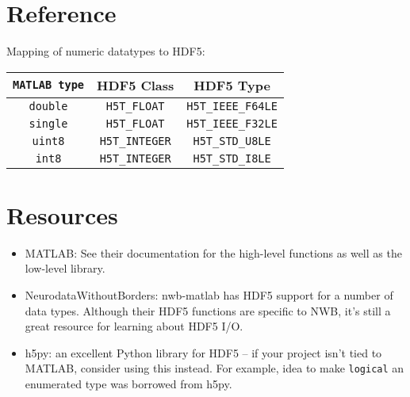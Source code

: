 \documentclass[11pt]{exam}
\begin{document}
    \section{Reference}
    \noindent Mapping of numeric datatypes to HDF5:\\$\quad$\vspace{-1ex}\\
    \begin{center}
    \begin{tabular}{| c | c | c |}
        \hline
        \texttt{MATLAB type} & \textbf{HDF5 Class} & \textbf{HDF5 Type}\\
        \hline
        \texttt{double} & \texttt{H5T\_FLOAT} & \texttt{H5T\_IEEE\_F64LE}\\
        \texttt{single} & \texttt{H5T\_FLOAT} & \texttt{H5T\_IEEE\_F32LE}\\
        \texttt{uint8} & \texttt{H5T\_INTEGER} & \texttt{H5T\_STD\_U8LE}\\
        \texttt{int8} & \texttt{H5T\_INTEGER} & \texttt{H5T\_STD\_I8LE}\\
        \hline
    \end{tabular}
    \end{center}

    \section{Resources}
    \begin{itemize}
        \item MATLAB: See their documentation for the high-level functions as well as the low-level library.
        \item NeurodataWithoutBorders: nwb-matlab has HDF5 support for a number of data types. Although their HDF5 functions are specific to NWB, it's still a great resource for learning about HDF5 I/O. 
        \item h5py: an excellent Python library for HDF5 -- if your project isn't tied to MATLAB, consider using this instead. For example, idea to make \texttt{logical} an enumerated type was borrowed from h5py. 
    \end{itemize}
\end{document}
